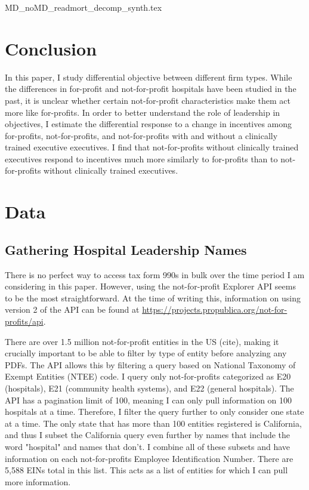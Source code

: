 \documentclass[12pt]{article}
\begin{document}
    {MD_noMD_readmort_decomp_synth.tex}

     
 

    \section{Conclusion}

    In this paper, I study differential objective between different firm types. While the differences in for-profit and not-for-profit hospitals have been studied in the past, it is unclear whether certain not-for-profit characteristics make them act more like for-profits. In order to better understand the role of leadership in objectives, I estimate the differential response to a change in incentives among for-profits, not-for-profits, and not-for-profits with and without a clinically trained executive executives. I find that not-for-profits without clinically trained executives respond to incentives much more similarly to for-profits than to not-for-profits without clinically trained executives.

	
	\newpage

    \printbibliography

\appendix

 \section{Data}\label{appendixdata}

\subsection{Gathering Hospital Leadership Names}

There is no perfect way to access tax form 990s in bulk over the time period I am considering in this paper. However, using the not-for-profit Explorer API seems to be the most straightforward. At the time of writing this, information on using version 2 of the API can be found at \hyperlink{https://projects.propublica.org/not-for-profits/api}{https://projects.propublica.org/not-for-profits/api}. 
    
There are over 1.5 million not-for-profit entities in the US (cite), making it crucially important to be able to filter by type of entity before analyzing any PDFs. The API allows this by filtering a query based on National Taxonomy of Exempt Entities (NTEE) code. I query only not-for-profits categorized as E20 (hospitals), E21 (community health systems), and E22 (general hospitals). The API has a pagination limit of 100, meaning I can only pull information on 100 hospitals at a time. Therefore, I filter the query further to only consider one state at a time. The only state that has more than 100 entities registered is California, and thus I subset the California query even further by names that include the word "hospital" and names that don't. I combine all of these subsets and have information on each not-for-profits Employee Identification Number. There are 5,588 EINs total in this list. This acts as a list of entities for which I can pull more information. 
\end{document}
